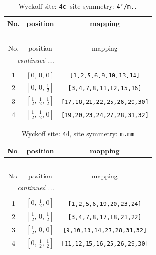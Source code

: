 \documentclass[fleqn,8pt]{jsarticle}
\begin{document}
\renewcommand{\arraystretch}{1.2}
\begin{longtable}{ccc}
\caption{Wyckoff site: {\tt 4c}, site symmetry: {\tt 4'/m..}}
 \\
 \hline \hline
No. & position & mapping \\ \hline \endfirsthead

\multicolumn{2}{l}{\tablename\ \thetable{}} \\
 \hline \hline
No. & position & mapping \\ \hline \endhead

 \hline \hline
\multicolumn{2}{r}{\footnotesize\it continued ...} \\ \endfoot

 \hline \hline
\multicolumn{2}{r}{} \\ \endlastfoot

1 & $\left[ 0,\, 0,\, 0 \right]$ & {\tt [1,2,5,6,9,10,13,14]} \\ \hline
2 & $\left[ 0,\, 0,\, \frac{1}{2} \right]$ & {\tt [3,4,7,8,11,12,15,16]} \\ \hline
3 & $\left[ \frac{1}{2},\, \frac{1}{2},\, \frac{1}{2} \right]$ & {\tt [17,18,21,22,25,26,29,30]} \\ \hline
4 & $\left[ \frac{1}{2},\, \frac{1}{2},\, 0 \right]$ & {\tt [19,20,23,24,27,28,31,32]} \\
\end{longtable}
\renewcommand{\arraystretch}{1.2}
\begin{longtable}{ccc}
\caption{Wyckoff site: {\tt 4d}, site symmetry: {\tt m.mm}}
 \\
 \hline \hline
No. & position & mapping \\ \hline \endfirsthead

\multicolumn{2}{l}{\tablename\ \thetable{}} \\
 \hline \hline
No. & position & mapping \\ \hline \endhead

 \hline \hline
\multicolumn{2}{r}{\footnotesize\it continued ...} \\ \endfoot

 \hline \hline
\multicolumn{2}{r}{} \\ \endlastfoot

1 & $\left[ 0,\, \frac{1}{2},\, 0 \right]$ & {\tt [1,2,5,6,19,20,23,24]} \\ \hline
2 & $\left[ \frac{1}{2},\, 0,\, \frac{1}{2} \right]$ & {\tt [3,4,7,8,17,18,21,22]} \\ \hline
3 & $\left[ \frac{1}{2},\, 0,\, 0 \right]$ & {\tt [9,10,13,14,27,28,31,32]} \\ \hline
4 & $\left[ 0,\, \frac{1}{2},\, \frac{1}{2} \right]$ & {\tt [11,12,15,16,25,26,29,30]} \\
\end{longtable}
\end{document}
